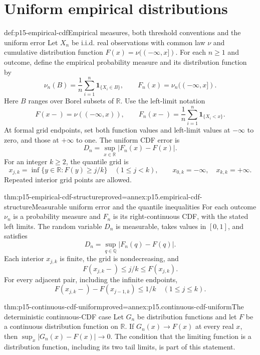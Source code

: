 \section{Uniform empirical distributions}
\label{sec:p15-empirical-distributions}

\begin{hbdefinition}{def:p15-empirical-cdf}{Empirical measures, both threshold conventions and the uniform error}
Let \(X_n\) be i.i.d. real observations with common law \(\nu\)
and cumulative distribution function \(F(x)=\nu((-\infty,x])\).
For each \(n\geq1\) and outcome, define the empirical probability
measure and its distribution function by
\[
 \nu_n(B)=\frac1n\sum_{i=1}^n\mathbf1_{\{X_i\in B\}},
 \qquad
 F_n(x)=\nu_n((-\infty,x]).
\]
Here \(B\) ranges over Borel subsets of \(\mathbb R\).
Use the left-limit notation
\[
 F(x-)=\nu((-\infty,x)),\qquad
 F_n(x-)=\frac1n\sum_{i=1}^n\mathbf1_{\{X_i<x\}}.
\]
At formal grid endpoints, set both function values and left-limit
values at \(-\infty\) to zero, and those at \(+\infty\) to one.
The uniform CDF error is
\[
 D_n=\sup_{x\in\mathbb R}|F_n(x)-F(x)|.
\]
For an integer \(k\geq2\), the quantile grid is
\[
 x_{j,k}=\inf\{y\in\mathbb R:F(y)\geq j/k\}
 \quad(1\leq j<k),\qquad x_{0,k}=-\infty,\quad x_{k,k}=+\infty.
\]
Repeated interior grid points are allowed.
\end{hbdefinition}

\begin{hblemma}{thm:p15-empirical-cdf-structure}{proved=annex:p15.empirical-cdf-structure}{Measurable uniform error and the quantile inequalities}
For each outcome \(\nu_n\) is a probability measure and \(F_n\)
is its right-continuous CDF, with the stated left limits.
The random variable \(D_n\) is measurable, takes values in \([0,1]\),
and satisfies
\[
 D_n=\sup_{q\in\mathbb Q}|F_n(q)-F(q)|.
\]
Each interior \(x_{j,k}\) is finite, the grid is nondecreasing, and
\[
 F(x_{j,k}-)\leq j/k\leq F(x_{j,k}).
\]
For every adjacent pair, including the infinite endpoints,
\[
 F(x_{j,k}-)-F(x_{j-1,k})\leq1/k\quad(1\leq j\leq k).
\]
\end{hblemma}

\begin{hblemma}{thm:p15-continuous-cdf-uniform}{proved=annex:p15.continuous-cdf-uniform}{The deterministic continuous-CDF case}
Let \(G_n\) be distribution functions and let \(F\) be a continuous
distribution function on \(\mathbb R\). If \(G_n(x)\to F(x)\)
at every real \(x\), then
\(\sup_x|G_n(x)-F(x)|\to0\).
The condition that the limiting function is a distribution function,
including its two tail limits, is part of this statement.
\end{hblemma}

